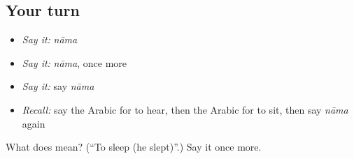 \subsection*{Your turn}
\begin{itemize}
\raggedright
  \item \emph{Say it:} \emph{nāma}
  \item \emph{Say it:} \emph{nāma}, once more
  \item \emph{Say it:} say \emph{nāma}
  \item \emph{Recall:} say the Arabic for to hear, then the Arabic for to sit, then say \emph{nāma} again
\end{itemize}

\begin{tcolorbox}[breakable,colback=teal!4,colframe=teal!35!black,title={Before you move on}]
What does  mean? (\textquotedblleft{}To sleep (he slept)\textquotedblright{}.) Say it once more.
\end{tcolorbox}
